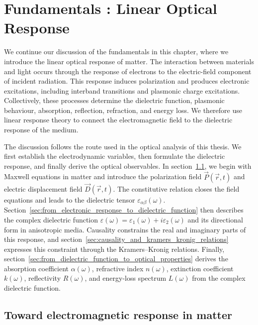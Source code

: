 \chapter{Fundamentals : Linear Optical Response}
\label{cha:fundamentals_b}

We continue our discussion of the fundamentals in this chapter, where we introduce the linear optical response of matter.
The interaction between materials and light occurs through the response of electrons to the electric-field component of incident radiation.
This response induces polarization and produces electronic excitations, including interband transitions and plasmonic charge excitations.
Collectively, these processes determine the dielectric function, plasmonic behaviour, absorption, reflection, refraction, and energy loss.
We therefore use linear response theory to connect the electromagnetic field to the dielectric response of the medium.

The discussion follows the route used in the optical analysis of this thesis.
We first establish the electrodynamic variables, then formulate the dielectric response, and finally derive the optical observables.
In section~\ref{sec:toward_electromagnetic_response_in_matter}, we begin with Maxwell equations in matter and introduce the polarization field $\vec{P}(\vec{r},t)$ and electric displacement field $\vec{D}(\vec{r},t)$.
The constitutive relation closes the field equations and leads to the dielectric tensor $\varepsilon_{\alpha\beta}(\omega)$.
Section~\ref{sec:from_electronic_response_to_dielectric_function} then describes the complex dielectric function $\varepsilon(\omega)=\varepsilon_1(\omega)+i\varepsilon_2(\omega)$ and its directional form in anisotropic media.
Causality constrains the real and imaginary parts of this response, and section~\ref{sec:causality_and_kramers_kronig_relations} expresses this constraint through the Kramers--Kronig relations.
Finally, section~\ref{sec:from_dielectric_function_to_optical_properties} derives the absorption coefficient $\alpha(\omega)$, refractive index $n(\omega)$, extinction coefficient $k(\omega)$, reflectivity $R(\omega)$, and energy-loss spectrum $L(\omega)$ from the complex dielectric function.

\newpage
\section{Toward electromagnetic response in matter}
\label{sec:toward_electromagnetic_response_in_matter}

